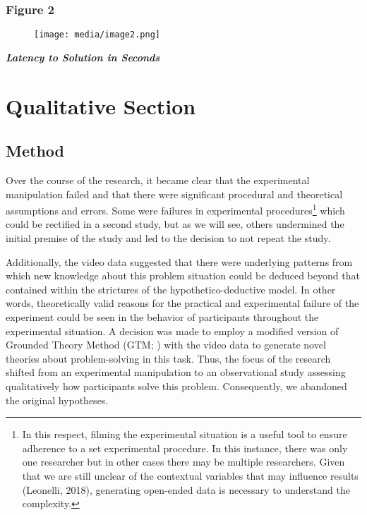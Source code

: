 \documentclass{article}
\begin{document}
\subsubsection{}

\subsubsection{Figure 2}


\begin{figure}

  \texttt{[image: media/image2.png]}
\caption{}
\label{}


\end{figure}
\emph{\textbf{Latency to Solution in Seconds}}





\section{Qualitative Section}

\subsection{Method}

Over the course of the research, it became clear that the experimental manipulation failed and that there were significant procedural and theoretical assumptions and errors. Some were failures in experimental procedures\footnote{In this respect, filming the experimental situation is a useful tool to ensure adherence to a set experimental procedure. In this instance, there was only one researcher but in other cases there may be multiple researchers. Given that we are still unclear of the contextual variables that may influence results (Leonelli, 2018), generating open-ended data is necessary to understand the complexity. 

} which could be rectified in a second study, but as we will see, others undermined the initial premise of the study and led to the decision to not repeat the study. 

Additionally, the video data suggested that there were underlying patterns from which new knowledge about this problem situation could be deduced beyond that contained within the strictures of the hypothetico-deductive model. In other words, theoretically valid reasons for the practical and experimental failure of the experiment could be seen in the behavior of participants throughout the experimental situation. A decision was made to employ a modified version of Grounded Theory Method (GTM; \parencite{Glaser1967}) with the video data to generate novel theories about problem-solving in this task. Thus, the focus of the research shifted from an experimental manipulation to an observational study assessing qualitatively how participants solve this problem. Consequently, we abandoned the original hypotheses. 
\end{document}
